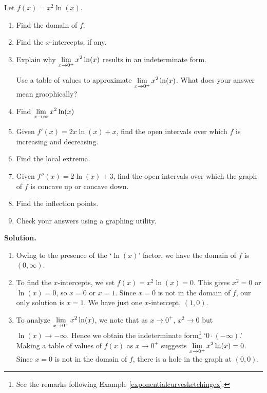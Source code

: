 \documentclass{ximera}
\begin{document}
\begin{ex}\label{logcurvesketchex} Let  $f(x) = x^2 \ln(x)$.

\begin{enumerate}

\item  Find the domain of $f$.

\item  Find the $x$-intercepts, if any.

\item Explain why $\ds{ \lim_{x \rightarrow 0^{+}} x^2 \ln(x)}$ results in an indeterminate form.

Use a table of values  to approximate $\ds{ \lim_{x \rightarrow 0^{+}} x^2 \ln(x)}$.  What does your answer mean graophically? 

\item  Find  $\ds{ \lim_{x \rightarrow \infty} x^2 \ln(x)}$ 

\item  Given $f'(x) = 2x \ln(x) + x$, find the open intervals over which $f$ is increasing and decreasing.

\item  Find the local extrema.

\item  Given $f''(x) = 2 \ln(x) + 3$, find the open intervals over which the graph of $f$ is concave up or concave down.

\item Find the inflection points.

\item  Check your answers using a graphing utility.

\end{enumerate} 

{\bf Solution.}  

\begin{enumerate}

\item  Owing to the presence of the `$\ln(x)$' factor, we have the domain of $f$ is $(0, \infty)$.

\item  To find the $x$-intercepts, we set $f(x) = x^2 \ln(x) = 0$.  This gives $x^2 = 0$ or $\ln(x) = 0$, so $x = 0$ or $x = 1$.  Since $x=0$ is not in the domain of $f$, our only solution is $x = 1$. We have just one $x$-intercept, $(1,0)$.

\item   To analyze $\ds{ \lim_{x \rightarrow 0^{+}} x^2 \ln(x)}$, we note that as $x \rightarrow 0^{+}$, $x^2 \rightarrow 0$ but $\ln(x) \rightarrow -\infty$.  Hence we obtain the indeterminate form\footnote{See the remarks following Example \ref{exponentialcurvesketchingex}.} `$0 \cdot (- \infty)$.'   Making a table of values of $f(x)$ as $x \rightarrow 0^{+}$ suggests  $\ds{ \lim_{x \rightarrow 0^{+}} x^2 \ln(x) = 0}$.  Since $x = 0$ is not in the domain of $f$, there is a hole in the graph at $(0,0)$.


\end{enumerate}
\end{ex}
\end{document}
